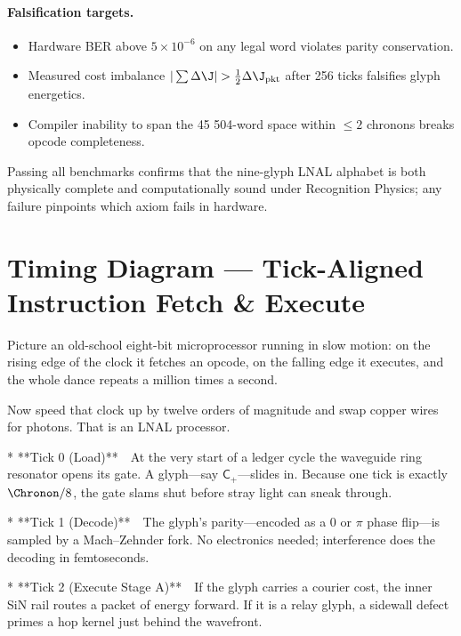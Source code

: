 \documentclass[11pt,oneside]{book}
\begin{document}
\paragraph{Falsification targets.}
\begin{itemize}\setlength\itemsep{3pt}
\item Hardware BER above $5\times10^{-6}$ on any legal word violates
      parity conservation.
\item Measured cost imbalance
      $|\sum\Delta\J|>\tfrac12\Delta\J_{\text{pkt}}$
      after 256 ticks falsifies glyph energetics.
\item Compiler inability to span the 45 504-word space within
      \(\le2\) chronons breaks opcode completeness.
\end{itemize}

Passing all benchmarks confirms that the nine-glyph LNAL alphabet is
both physically complete and computationally sound under Recognition
Physics; any failure pinpoints which axiom fails in hardware.


\section{Timing Diagram — Tick-Aligned Instruction Fetch & Execute}
\label{sec:lnal-timing-narrative}

Picture an old-school eight-bit microprocessor running in slow motion:
on the rising edge of the clock it fetches an opcode, on the falling
edge it executes, and the whole dance repeats a million times a
second.  

Now speed that clock up by twelve orders of magnitude and swap copper
wires for photons.  
That is an LNAL processor.

* **Tick 0 (Load)** At the very start of a ledger cycle the waveguide
  ring resonator opens its gate. A glyph—say $\mathsf{C_{+}}$—slides
  in. Because one tick is exactly $\Chronon/8$, the gate slams shut
  before stray light can sneak through.  

* **Tick 1 (Decode)** The glyph’s parity—encoded as a
  $0$ or $\pi$ phase flip—is sampled by a Mach–Zehnder fork. No
  electronics needed; interference does the decoding in femtoseconds.

* **Tick 2 (Execute Stage A)** If the glyph carries a courier cost,
  the inner SiN rail routes a packet of energy forward. If it is a
  relay glyph, a sidewall defect primes a hop kernel just behind the
  wavefront.
\end{document}
